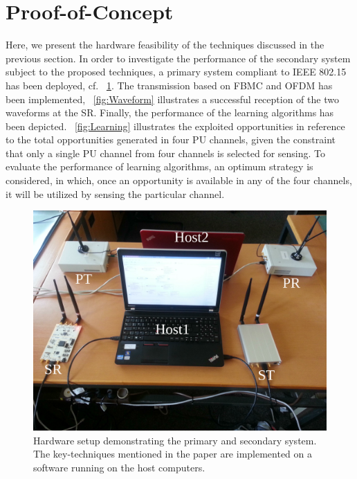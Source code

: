 \documentclass[conference, twocolumn]{IEEEtran}
\begin{document}
\section{Proof-of-Concept} \label{sec:pof}
Here, we present the hardware feasibility of the techniques discussed in the previous section. In order to investigate the performance of the secondary system subject to the proposed techniques, a primary system compliant to IEEE 802.15 has been deployed, cf. \figurename~\ref{fig:SetUp}. The transmission based on FBMC and OFDM has been implemented, \figurename~\ref{fig:Waveform} illustrates a successful reception of the two waveforms at the SR. Finally, the performance of the learning algorithms has been depicted. \figurename~\ref{fig:Learning} illustrates the exploited opportunities in reference to the total opportunities generated in four PU channels, given the constraint that only a single PU channel from four channels is selected for sensing. To evaluate the performance of learning algorithms, an optimum strategy is considered, in which, once an opportunity is available in any of the four channels, it will be utilized by sensing the particular channel.
\begin{figure}[!t]
\centering
\includegraphics[width = 0.9 \columnwidth]{figures/SetUp}
\caption{Hardware setup demonstrating the primary and secondary system. The key-techniques mentioned in the paper are implemented on a software running on the host computers.} 
\vspace{-4mm}
\label{fig:SetUp}
\end{figure}
\end{document}
